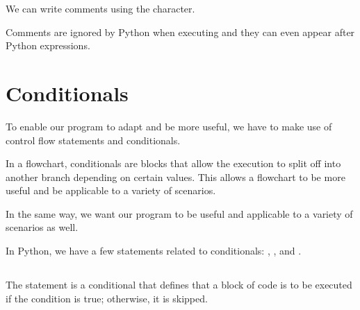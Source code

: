 \documentclass[letterpaper,10pt,english]{jupyterBook}
\begin{document}
\sphinxAtStartPar
We can write comments using the \sphinxcode{\sphinxupquote{\#}} character.

\begin{sphinxVerbatim}[commandchars=\\\{\}]
\end{sphinxVerbatim}

\sphinxAtStartPar
Comments are ignored by Python when executing and they can even appear after Python expressions.

\begin{sphinxVerbatim}[commandchars=\\\{\}]
     
\end{sphinxVerbatim}

\sphinxstepscope


\chapter{Conditionals}
\label{\detokenize{conditionals:conditionals}}\label{\detokenize{conditionals::doc}}
\sphinxAtStartPar
To enable our program to adapt and be more useful, we have to make use of control flow statements and conditionals.

\sphinxAtStartPar
In a flowchart, conditionals are blocks that allow the execution to split off into another branch depending on certain values.
This allows a flowchart to be more useful and be applicable to a variety of scenarios.

\sphinxAtStartPar
In the same way, we want our program to be useful and applicable to a variety of scenarios as well.

\sphinxAtStartPar
In Python, we have a few statements related to conditionals: , , and .


\section{}
\label{\detokenize{conditionals:if}}
\sphinxAtStartPar
The  statement is a conditional that defines that a block of code is to be executed if the condition is true; otherwise, it is skipped.
\end{document}
